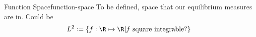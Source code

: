 \begin{definition}{Function Space}{function-space}
  To be defined, space that our equilibrium measures are in. Could be
  $$\functionspace := \{f: \R \mapsto \R | f ~\text{square integrable?}\}$$
  \hierKoennteIhreWerbungStehen
\end{definition}
